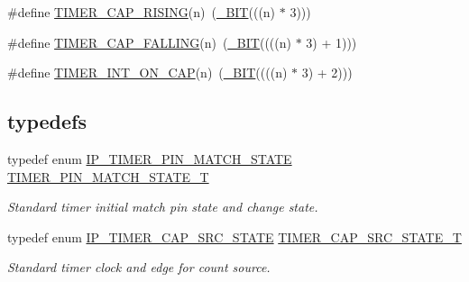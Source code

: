 \begin{DoxyCompactItemize}
\#define \hyperlink{group___t_i_m_e_r__18_x_x__43_x_x_ga34ab45ae29494cf8f92fdc4e6eb7bb06}{T\+I\+M\+E\+R\+\_\+\+C\+A\+P\+\_\+\+R\+I\+S\+I\+NG}(n)~(\hyperlink{group___l_p_c___types___public___macros_ga7ee022f5e5a971a8324e4b7572d49170}{\+\_\+\+B\+IT}(((n) $\ast$ 3)))
\item 
\#define \hyperlink{group___t_i_m_e_r__18_x_x__43_x_x_gad35ff35bf622cb530f2206ecdd861a7d}{T\+I\+M\+E\+R\+\_\+\+C\+A\+P\+\_\+\+F\+A\+L\+L\+I\+NG}(n)~(\hyperlink{group___l_p_c___types___public___macros_ga7ee022f5e5a971a8324e4b7572d49170}{\+\_\+\+B\+IT}((((n) $\ast$ 3) + 1)))
\item 
\#define \hyperlink{group___t_i_m_e_r__18_x_x__43_x_x_ga39a441a62cb174fd89ebc217417482c9}{T\+I\+M\+E\+R\+\_\+\+I\+N\+T\+\_\+\+O\+N\+\_\+\+C\+AP}(n)~(\hyperlink{group___l_p_c___types___public___macros_ga7ee022f5e5a971a8324e4b7572d49170}{\+\_\+\+B\+IT}((((n) $\ast$ 3) + 2)))
\end{DoxyCompactItemize}
\subsection*{\textquotesingle{}typedefs\textquotesingle{}}
\begin{DoxyCompactItemize}
\item 
typedef enum \hyperlink{group___t_i_m_e_r__18_x_x__43_x_x_ga29caa12f43ff996d3ebbf7d5f9036f2c}{I\+P\+\_\+\+T\+I\+M\+E\+R\+\_\+\+P\+I\+N\+\_\+\+M\+A\+T\+C\+H\+\_\+\+S\+T\+A\+TE} \hyperlink{group___t_i_m_e_r__18_x_x__43_x_x_ga15be0f559655d587ad466689f639ab72}{T\+I\+M\+E\+R\+\_\+\+P\+I\+N\+\_\+\+M\+A\+T\+C\+H\+\_\+\+S\+T\+A\+T\+E\+\_\+T}
\begin{DoxyCompactList}\small\item\em Standard timer initial match pin state and change state. \end{DoxyCompactList}\item 
typedef enum \hyperlink{group___t_i_m_e_r__18_x_x__43_x_x_ga1ceafbd6fb46418e292878934efb63aa}{I\+P\+\_\+\+T\+I\+M\+E\+R\+\_\+\+C\+A\+P\+\_\+\+S\+R\+C\+\_\+\+S\+T\+A\+TE} \hyperlink{group___t_i_m_e_r__18_x_x__43_x_x_ga3f9e5a3ea9ebb982339b786ff7946408}{T\+I\+M\+E\+R\+\_\+\+C\+A\+P\+\_\+\+S\+R\+C\+\_\+\+S\+T\+A\+T\+E\+\_\+T}
\begin{DoxyCompactList}\small\item\em Standard timer clock and edge for count source. \end{DoxyCompactList}\end{DoxyCompactItemize}

